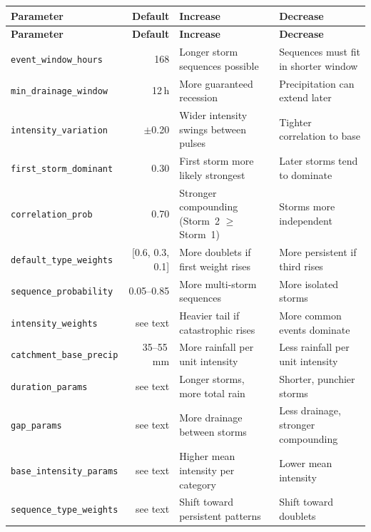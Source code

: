 \documentclass[11pt,a4paper]{article}
\begin{document}
\begin{longtable}{p{4.2cm}rp{3.5cm}p{3.5cm}}
\toprule
\textbf{Parameter} & \textbf{Default} & \textbf{Increase} & \textbf{Decrease} \\
\midrule
\endfirsthead
\toprule
\textbf{Parameter} & \textbf{Default} & \textbf{Increase} & \textbf{Decrease} \\
\midrule
\endhead
\texttt{event\_window\_hours} & 168 &
  Longer storm sequences possible &
  Sequences must fit in shorter window \\[4pt]
\texttt{min\_drainage\_window} & 12\,h &
  More guaranteed recession &
  Precipitation can extend later \\[4pt]
\texttt{intensity\_variation} & $\pm$0.20 &
  Wider intensity swings between pulses &
  Tighter correlation to base \\[4pt]
\texttt{first\_storm\_dominant} & 0.30 &
  First storm more likely strongest &
  Later storms tend to dominate \\[4pt]
\texttt{correlation\_prob} & 0.70 &
  Stronger compounding (Storm~2 $\geq$ Storm~1) &
  Storms more independent \\[4pt]
\texttt{default\_type\_weights} & [0.6, 0.3, 0.1] &
  More doublets if first weight rises &
  More persistent if third rises \\[4pt]
\texttt{sequence\_probability} & 0.05--0.85 &
  More multi-storm sequences &
  More isolated storms \\[4pt]
\texttt{intensity\_weights} & see text &
  Heavier tail if catastrophic rises &
  More common events dominate \\[4pt]
\texttt{catchment\_base\_precip} & 35--55\,mm &
  More rainfall per unit intensity &
  Less rainfall per unit intensity \\[4pt]
\texttt{duration\_params} & see text &
  Longer storms, more total rain &
  Shorter, punchier storms \\[4pt]
\texttt{gap\_params} & see text &
  More drainage between storms &
  Less drainage, stronger compounding \\[4pt]
\texttt{base\_intensity\_params} & see text &
  Higher mean intensity per category &
  Lower mean intensity \\[4pt]
\texttt{sequence\_type\_weights} & see text &
  Shift toward persistent patterns &
  Shift toward doublets \\
\bottomrule
\end{longtable}

\end{document}
